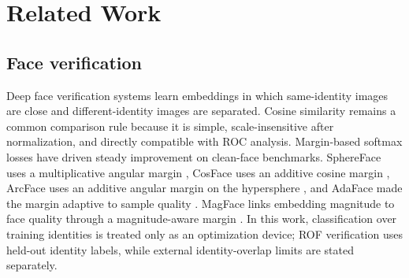 \documentclass[12pt,a4paper,oneside]{report}
\begin{document}
\chapter{Related Work}
\label{sec:related}
\section{Face verification}
Deep face verification systems learn embeddings in which same-identity images are close and different-identity images are separated. Cosine similarity remains a common comparison rule because it is simple, scale-insensitive after normalization, and directly compatible with ROC analysis. Margin-based softmax losses have driven steady improvement on clean-face benchmarks. SphereFace uses a multiplicative angular margin \cite{sphereface}, CosFace uses an additive cosine margin \cite{cosface}, ArcFace uses an additive angular margin on the hypersphere \cite{arcface}, and AdaFace made the margin adaptive to sample quality \cite{adaface}. MagFace links embedding magnitude to face quality through a magnitude-aware margin \cite{magface}. In this work, classification over training identities is treated only as an optimization device; ROF verification uses held-out identity labels, while external identity-overlap limits are stated separately.
\end{document}

